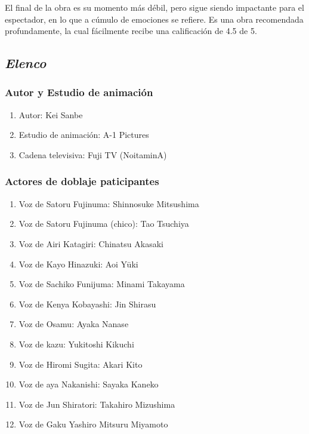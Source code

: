 \documentclass[A5paper, 11pt]{article}
\begin{document}
El final de la obra es su momento m\'as d\'ebil, pero sigue siendo impactante para el espectador, en lo que a c\'umulo de emociones se refiere. Es una obra recomendada profundamente, la cual f\'acilmente recibe una calificaci\'on de 4.5 de 5.

  \subsection{\textit{Elenco}}
\subsubsection{Autor y Estudio de animaci\'on}
\begin{enumerate}
    \item Autor: Kei Sanbe
    \item Estudio de animaci\'on: A-1 Pictures
    \item Cadena televisiva: Fuji TV (NoitaminA)
\end{enumerate}

 \subsubsection{Actores de doblaje paticipantes}
 \begin{enumerate}
      \item Voz de Satoru Fujinuma: Shinnosuke Mitsushima
      \item Voz de Satoru Fujinuma (chico): Tao Tsuchiya
      \item Voz de Airi Katagiri: Chinatsu Akasaki
      \item Voz de Kayo Hinazuki: Aoi Yūki
      \item Voz de Sachiko Funijuma: Minami Takayama
      \item Voz de Kenya Kobayashi: Jin Shirasu
      \item Voz de Osamu: Ayaka Nanase
      \item Voz de kazu: Yukitoshi Kikuchi
      \item Voz de Hiromi Sugita: Akari Kito
      \item Voz de aya Nakanishi: Sayaka Kaneko
      \item Voz de Jun Shiratori: Takahiro Mizushima
      \item Voz de Gaku Yashiro Mitsuru Miyamoto

\end{enumerate}
\end{document}
